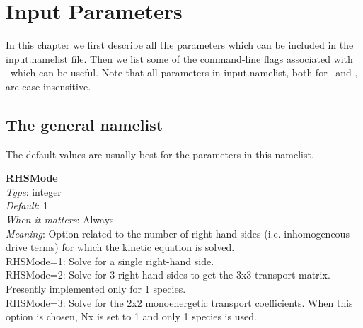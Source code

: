 \chapter{Input Parameters}
\label{ch:input}

\newcommand{\param}[5]{{\setlength{\parindent}{0cm} {\ttfamily \bfseries #1}\\{\it Type}: #2\\{\it Default}: #3\\{\it When it matters}: #4\\{\it Meaning}: #5}}
\newcommand{\ssparam}[4]{{\setlength{\parindent}{0cm} {\ttfamily \bfseries #1}\\{\it Type}: #2\\{\it When it matters}: #3\\{\it Meaning}: #4}}
\newcommand{\PETScParam}[2]{{\setlength{\parindent}{0cm} {\ttfamily \bfseries #1}\\{\it Meaning}: #2}}
\newcommand{\myhrule}{{\setlength{\parindent}{0cm} \hrulefill }}

\newcommand{\true}{{\ttfamily .true.}}
\newcommand{\false}{{\ttfamily .false.}}

In this chapter we first describe all the parameters which can be included in the {\ttfamily input.namelist} file. 
Then we list some of the command-line flags associated with \PETSc~which can be useful.
Note that all parameters in {\ttfamily input.namelist}, both for \sfincs~and \sfincsScan,
are case-insensitive.




\section{The {\ttfamily general} namelist}

The default values are usually best for the parameters in this namelist.

\myhrule

\param{RHSMode}
{integer}
{1}
{Always}
{Option related to the number of right-hand sides (i.e. inhomogeneous drive terms) for which the kinetic equation is solved.\\

{\ttfamily RHSMode=1}: Solve for a single right-hand side.\\

{\ttfamily RHSMode=2}: Solve for 3 right-hand sides to get the 3x3 transport matrix. Presently implemented only for 1 species.\\

{\ttfamily RHSMode=3}: Solve for the 2x2 monoenergetic transport coefficients. When this option is chosen, {\ttfamily Nx} is set to 1 and only 1 species is used.
}

